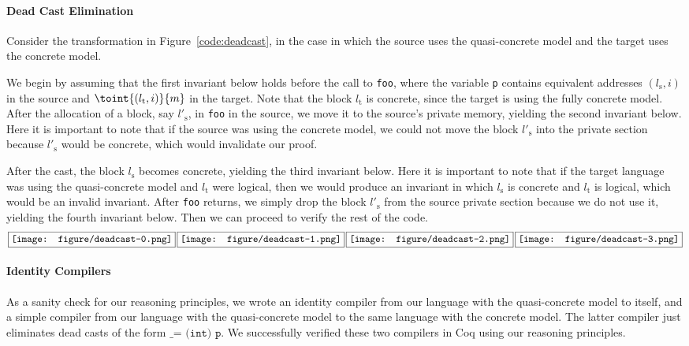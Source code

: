 \paragraph{Dead Cast Elimination}

Consider the transformation in Figure~\ref{code:deadcast}, in the case in which
the source uses the quasi-concrete model and the target uses the
concrete model.

We begin by assuming that the first invariant below holds before the call to
\texttt{foo}, where the variable \texttt{p} contains equivalent
addresses $(l_\text{s},i)$ in the source and $\toint{(l_\text{t},i)}{m}$ in the target.
Note that the block $l_\text{t}$ is concrete, since the target is using
the fully concrete model. After the allocation of a block, say
$l'_\text{s}$, in \texttt{foo} in the source, we move it to the source's
private memory, yielding the second invariant below.  Here it is important
to note that if the source was using the concrete model, we could not move
the block $l'_\text{s}$ into the private section because $l'_\text{s}$
would be concrete, which would invalidate our proof.

After the cast, the block $l_\text{s}$ becomes concrete, yielding the third
invariant below.  Here it is important to note that if the target
language was using the quasi-concrete model and $l_\text{t}$ were logical,
then we would produce an invariant in which $l_\text{s}$ is
concrete and $l_\text{t}$ is logical, which would be an invalid invariant.  After
\texttt{foo} returns, we simply drop the block $l'_\text{s}$ from the
source private section because we do not use it, yielding the fourth
invariant below. Then we can proceed to verify the rest of the code.
\[
\fbox{\texttt{[image: figure/deadcast-0.png]}}\,
\fbox{\texttt{[image: figure/deadcast-1.png]}}\,
\fbox{\texttt{[image: figure/deadcast-2.png]}}\,
\fbox{\texttt{[image: figure/deadcast-3.png]}}
\]

\paragraph{Identity Compilers}
As a sanity check for our reasoning principles, we wrote an identity compiler from our language with the quasi-concrete
model to itself, and a simple compiler from our language with the quasi-concrete
model to the same language with the concrete model. The latter compiler just eliminates
dead casts of the form ${\texttt{\_ = (int) p}}$. We successfully verified these two compilers in Coq using our reasoning principles.

